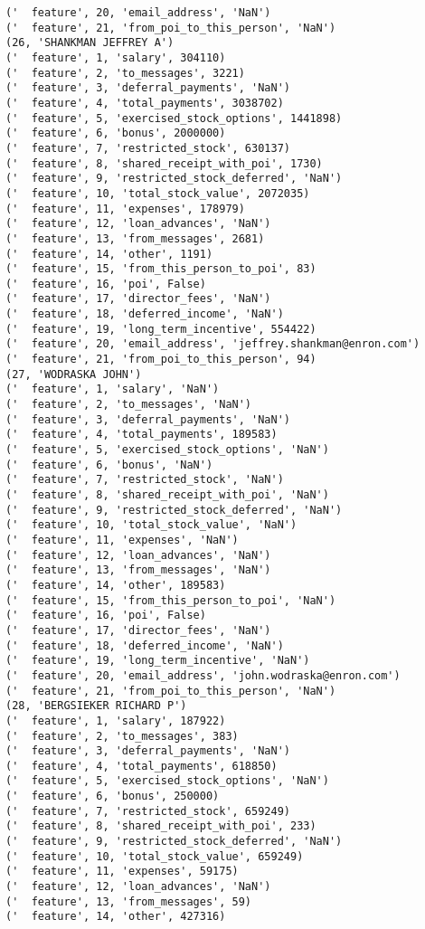 \begin{verbatim}
('  feature', 20, 'email_address', 'NaN')
('  feature', 21, 'from_poi_to_this_person', 'NaN')
(26, 'SHANKMAN JEFFREY A')
('  feature', 1, 'salary', 304110)
('  feature', 2, 'to_messages', 3221)
('  feature', 3, 'deferral_payments', 'NaN')
('  feature', 4, 'total_payments', 3038702)
('  feature', 5, 'exercised_stock_options', 1441898)
('  feature', 6, 'bonus', 2000000)
('  feature', 7, 'restricted_stock', 630137)
('  feature', 8, 'shared_receipt_with_poi', 1730)
('  feature', 9, 'restricted_stock_deferred', 'NaN')
('  feature', 10, 'total_stock_value', 2072035)
('  feature', 11, 'expenses', 178979)
('  feature', 12, 'loan_advances', 'NaN')
('  feature', 13, 'from_messages', 2681)
('  feature', 14, 'other', 1191)
('  feature', 15, 'from_this_person_to_poi', 83)
('  feature', 16, 'poi', False)
('  feature', 17, 'director_fees', 'NaN')
('  feature', 18, 'deferred_income', 'NaN')
('  feature', 19, 'long_term_incentive', 554422)
('  feature', 20, 'email_address', 'jeffrey.shankman@enron.com')
('  feature', 21, 'from_poi_to_this_person', 94)
(27, 'WODRASKA JOHN')
('  feature', 1, 'salary', 'NaN')
('  feature', 2, 'to_messages', 'NaN')
('  feature', 3, 'deferral_payments', 'NaN')
('  feature', 4, 'total_payments', 189583)
('  feature', 5, 'exercised_stock_options', 'NaN')
('  feature', 6, 'bonus', 'NaN')
('  feature', 7, 'restricted_stock', 'NaN')
('  feature', 8, 'shared_receipt_with_poi', 'NaN')
('  feature', 9, 'restricted_stock_deferred', 'NaN')
('  feature', 10, 'total_stock_value', 'NaN')
('  feature', 11, 'expenses', 'NaN')
('  feature', 12, 'loan_advances', 'NaN')
('  feature', 13, 'from_messages', 'NaN')
('  feature', 14, 'other', 189583)
('  feature', 15, 'from_this_person_to_poi', 'NaN')
('  feature', 16, 'poi', False)
('  feature', 17, 'director_fees', 'NaN')
('  feature', 18, 'deferred_income', 'NaN')
('  feature', 19, 'long_term_incentive', 'NaN')
('  feature', 20, 'email_address', 'john.wodraska@enron.com')
('  feature', 21, 'from_poi_to_this_person', 'NaN')
(28, 'BERGSIEKER RICHARD P')
('  feature', 1, 'salary', 187922)
('  feature', 2, 'to_messages', 383)
('  feature', 3, 'deferral_payments', 'NaN')
('  feature', 4, 'total_payments', 618850)
('  feature', 5, 'exercised_stock_options', 'NaN')
('  feature', 6, 'bonus', 250000)
('  feature', 7, 'restricted_stock', 659249)
('  feature', 8, 'shared_receipt_with_poi', 233)
('  feature', 9, 'restricted_stock_deferred', 'NaN')
('  feature', 10, 'total_stock_value', 659249)
('  feature', 11, 'expenses', 59175)
('  feature', 12, 'loan_advances', 'NaN')
('  feature', 13, 'from_messages', 59)
('  feature', 14, 'other', 427316)

\end{verbatim}
